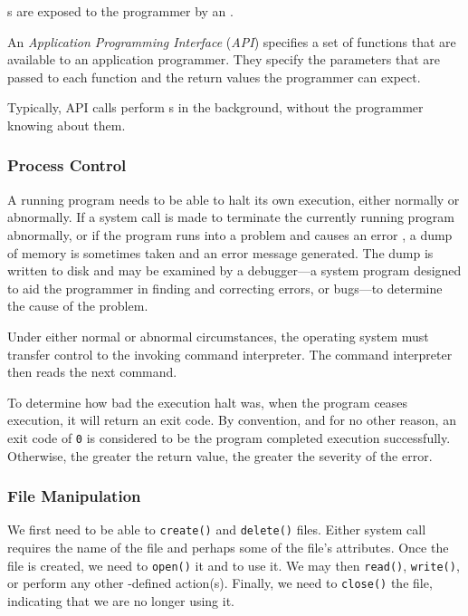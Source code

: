 s are exposed to the programmer by an .
\begin{definition}\label{def:API}
  An \emph{Application Programming Interface} (\emph{API}) specifies a set of functions that are available to an application programmer.
  They specify the parameters that are passed to each function and the return values the programmer can expect.

  Typically, API calls perform s in the background, without the programmer knowing about them.
\end{definition}

\subsubsection{Process Control}\label{subsubsec:Process_Control}
A running program needs to be able to halt its own execution, either normally or abnormally.
If a system call is made to terminate the currently running program abnormally, or if the program runs into a problem and causes an error , a dump of memory is sometimes taken and an error message generated.
The dump is written to disk and may be examined by a debugger—a system program designed to aid the programmer in finding and correcting errors, or bugs—to determine the cause of the problem.

Under either normal or abnormal circumstances, the operating system must transfer control to the invoking command interpreter.
The command interpreter then reads the next command.

To determine how bad the execution halt was, when the program ceases execution, it will return an exit code.
By convention, and for no other reason, an exit code of \texttt{0} is considered to be the program completed execution successfully.
Otherwise, the greater the return value, the greater the severity of the error.

\subsubsection{File Manipulation}\label{subsubsec:File_Manipulation}
We first need to be able to \texttt{create()} and \texttt{delete()} files.
Either system call requires the name of the file and perhaps some of the file’s attributes.
Once the file is created, we need to \texttt{open()} it and to use it.
We may then \texttt{read()}, \texttt{write()}, or perform any other -defined action(s).
Finally, we need to \texttt{close()} the file, indicating that we are no longer using it.

